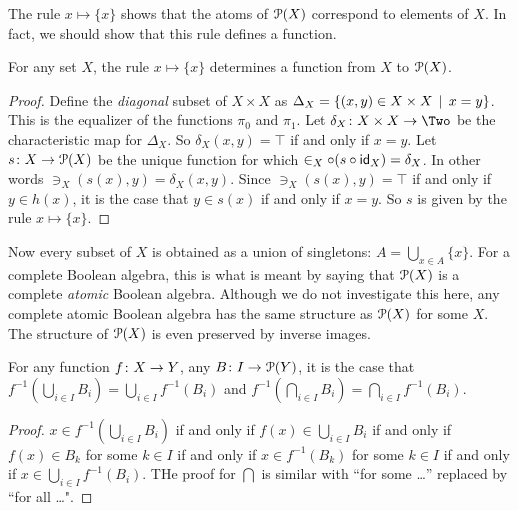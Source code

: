The rule $x\mapsto \{x\}$ shows that the atoms of ${\mathcal{P}}(X)$ correspond to elements of $X$. In fact, we should show that this rule defines a function.

\begin{lemma}
	For any set $X$, the rule $x\mapsto \{x\}$ determines a function from $X$ to ${\mathcal{P}}(X)$.
	
	\begin{proof}
		Define the \emph{diagonal} subset of $X\times X$ as $\Delta_X = \{(x,y)\in X\times X \,\mid\, x= y\}$. This is the equalizer of the functions $\pi_0$ and $\pi_1$. Let $\fromto {\delta_X}{X\times X}\Two$ be the characteristic map
		for $\Delta_X$. So $\delta_X(x,y)=\top$ if and only if $x=y$. 
		Let ${s}\colon{X}\to{{\mathcal{P}}(X)}$ be the unique function for which $\in_X\circ (s\circ \textsf{id}_X)= \delta_X$. In other words $\ni_X(s(x),y)=\delta_X(x,y)$. Since $\ni_X(s(x),y) =\top$ if and only if
		$y\in h(x)$, it is the case that $y\in s(x)$ if and only if $x=y$. So $s$ is given by the rule $x\mapsto \{x\}$. 
	\end{proof}
\end{lemma}

Now every subset of $X$ is obtained as a union of singletons: $A = \bigcup_{x\in A}\{x\}$. 
For a complete Boolean algebra, this is what is meant by saying that ${\mathcal{P}}(X)$ is a complete \emph{atomic} Boolean algebra. 
Although we do not investigate this here, any complete atomic Boolean algebra has the same structure as ${\mathcal{P}}(X)$ for some $X$. The structure of ${\mathcal{P}}(X)$ is even preserved by inverse images.

\begin{lemma}
	For any function ${f}\colon{X}\to{Y}$, any ${B}\colon{I}\to{{\mathcal{P}}(Y)}$, it is the case that $f^{-1}(\bigcup_{i\in I}B_i) = \bigcup_{i\in I}f^{-1}(B_i)$
	and $f^{-1}(\bigcap_{i\in I}B_i) = \bigcap_{i\in I}f^{-1}(B_i)$.
	
	\begin{proof}
		$x\in f^{-1}(\bigcup_{i\in I}B_i)$ if and only if $f(x)\in \bigcup_{i\in I}B_i$ if and only if $f(x)\in B_k$ for some $k\in I$ if and only if $x\in f^{-1}(B_k)$ for some $k\in I$ if and only if $x\in \bigcup_{i\in I}f^{-1}(B_i)$. THe proof for $\bigcap$ is similar with ``for some \ldots'' replaced by ``for all \ldots".  
	\end{proof}
\end{lemma}



